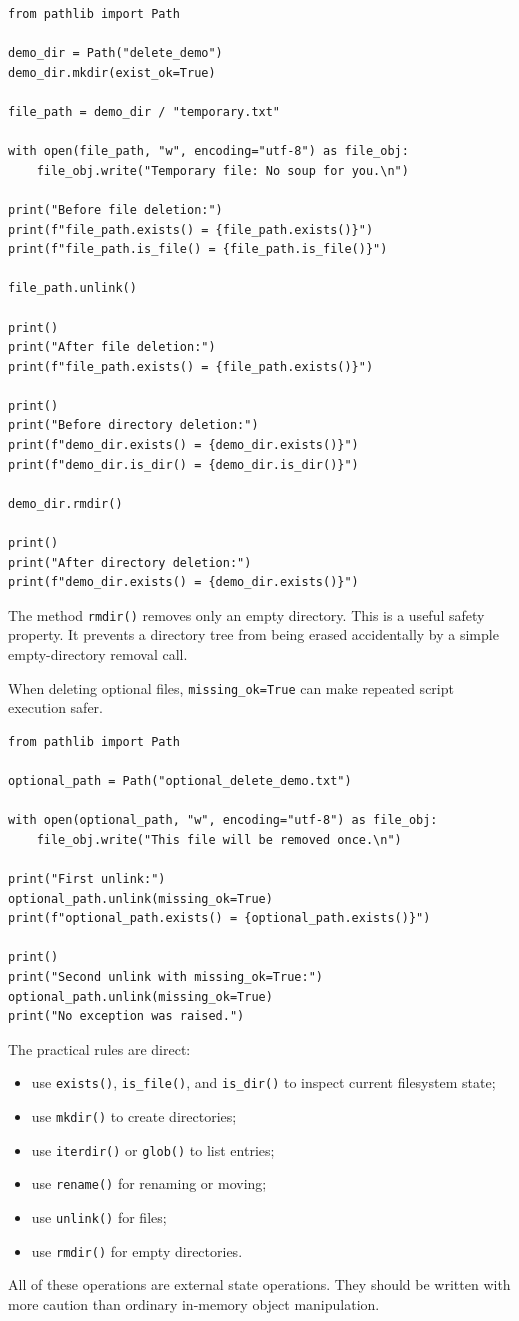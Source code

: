 \begin{verbatim}
from pathlib import Path

demo_dir = Path("delete_demo")
demo_dir.mkdir(exist_ok=True)

file_path = demo_dir / "temporary.txt"

with open(file_path, "w", encoding="utf-8") as file_obj:
    file_obj.write("Temporary file: No soup for you.\n")

print("Before file deletion:")
print(f"file_path.exists() = {file_path.exists()}")
print(f"file_path.is_file() = {file_path.is_file()}")

file_path.unlink()

print()
print("After file deletion:")
print(f"file_path.exists() = {file_path.exists()}")

print()
print("Before directory deletion:")
print(f"demo_dir.exists() = {demo_dir.exists()}")
print(f"demo_dir.is_dir() = {demo_dir.is_dir()}")

demo_dir.rmdir()

print()
print("After directory deletion:")
print(f"demo_dir.exists() = {demo_dir.exists()}")
\end{verbatim}

The method \texttt{rmdir()} removes only an empty directory. This is a useful safety property. It prevents a directory tree from being erased accidentally by a simple empty-directory removal call.

When deleting optional files, \texttt{missing\_ok=True} can make repeated script execution safer.

\begin{verbatim}
from pathlib import Path

optional_path = Path("optional_delete_demo.txt")

with open(optional_path, "w", encoding="utf-8") as file_obj:
    file_obj.write("This file will be removed once.\n")

print("First unlink:")
optional_path.unlink(missing_ok=True)
print(f"optional_path.exists() = {optional_path.exists()}")

print()
print("Second unlink with missing_ok=True:")
optional_path.unlink(missing_ok=True)
print("No exception was raised.")
\end{verbatim}

The practical rules are direct:

\begin{itemize}
    \item use \texttt{exists()}, \texttt{is\_file()}, and \texttt{is\_dir()} to inspect current filesystem state;
    \item use \texttt{mkdir()} to create directories;
    \item use \texttt{iterdir()} or \texttt{glob()} to list entries;
    \item use \texttt{rename()} for renaming or moving;
    \item use \texttt{unlink()} for files;
    \item use \texttt{rmdir()} for empty directories.
\end{itemize}

All of these operations are external state operations. They should be written with more caution than ordinary in-memory object manipulation.